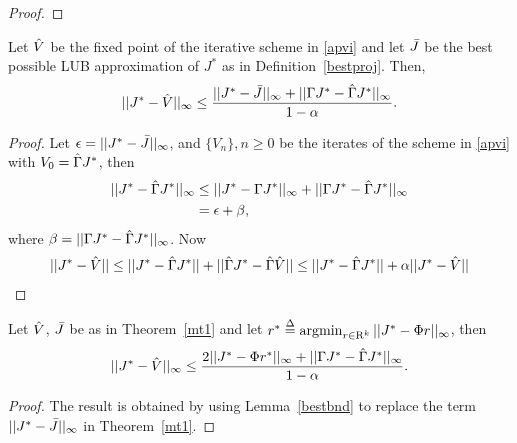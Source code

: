 \begin{proof}
\begin{comment}
Now, for showing that $V_1 \le V_0$ holds, fix any $i$. We need to show that $(\hg V_0)(i) = \min_j (\Phi r_{e_j,V_0})(i) = (\Phi r_{e_i,V_0})(i)$ is less than $V_0(i)$. By the definition of $r_{e_j,V_0}$ we know that $(\Phi r_{e_i,V_0})(i) \le (\Phi r)(i)$
holds for any $r$ such that $W^\top E \Phi r \ge W^\top H V_0$. Thus, it suffices to show that $r_i$ satisfies this latter inequality,
i.e., $W^\top E \Phi r_i \ge W^\top H V_0$. For this, it clearly sufficient if $\Phi r_i \ge V_0$. This however directly follows 
from the definition of $V_0$.
}
Since $V_1=\hg V_0$, from the definition of $\hg$ in \eqref{gamdef} and the construction of $V_0$, we have $V_0\geq V_1$, and recursively $V_{n}\geq V_{n+1}, \mb n\geq 0$. So it follows that $\hj\geq V_0\geq V_1\ldots\geq \hv$.
\end{comment}
\end{proof}
\begin{theorem}\label{mt1}
Let $\hat{V}$ be the fixed point of the iterative scheme in \eqref{apvi} and let $\bar{J}$ be the best possible LUB approximation of $J^*$ as in Definition~\ref{bestproj}. Then,
\begin{align}
||J^*-\hat{V}||_\infty\leq \frac{||J^*-\bar{J}||_\infty+||\Gamma J^*-\hat{\Gamma} J^*||_\infty}{1-\alpha}.
\end{align}
\end{theorem}
\begin{proof}
Let $\epsilon=||J^*-\bar{J}||_\infty$, and $\{V_n\},n\geq 0$ be the iterates of the scheme in \eqref{apvi} with $V_0=\hat{\Gamma} J^*$, then
\begin{align}
||J^*-\hat{\Gamma} J^*||_\infty&\leq||J^*-\Gamma J^*||_\infty+||\Gamma J^*-\hat{\Gamma} J^*||_\infty\nonumber\\
&= \epsilon+\beta,
\end{align}
where $\beta=||\Gamma J^*-\hat{\Gamma} J^*||_\infty$. Now
\begin{align}
||J^*-\hat{V}||\leq ||J^*-\hat{\Gamma} J^*||+||\hat{\Gamma} J^*-\hat{\Gamma} \hat{V}||\leq ||J^*-\hat{\Gamma} J^*||+\alpha || J^*- \hat{V}||
\end{align}
\end{proof}
\begin{corollary}\label{cmt1}
Let $\hat{V}$, $\bar{J}$ be as in Theorem~\ref{mt1} and let $r^*\stackrel{\Delta}{=}\operatorname{argmin}_{r\in \mathrm{R}^k}||J^*-\Phi r||_\infty$, then
\begin{align}
||J^*-\hat{V}||_\infty\leq \frac{2||J^*-\Phi r^*||_\infty+||\Gamma J^*-\hat{\Gamma} J^*||_\infty}{1-\alpha}.
\end{align}
\end{corollary}
\begin{proof}
The result is obtained by using Lemma~\ref{bestbnd} to replace the term $||J^*-\bar{J}||_\infty$ in Theorem~\ref{mt1}.
\end{proof}
